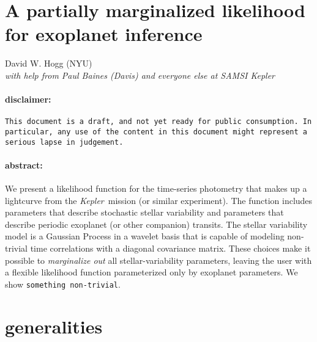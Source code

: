 \documentclass[12pt,letterpaper]{article}
\newcommand{\warning}[1]{\texttt{#1}}
\newcommand{\project}[1]{\textsl{#1}}
\newcommand{\Kepler}{\project{Kepler}}
\begin{document}
\sloppy\sloppypar

\section*{A partially marginalized likelihood for exoplanet inference}

\noindent
David W. Hogg (NYU) \\
\textit{with help from Paul Baines (Davis) and everyone else at SAMSI \Kepler}

\paragraph{disclaimer:}
\warning{This document is a draft, and not yet ready for public consumption.
In particular, any use of the content in this document might represent a serious lapse in judgement.}

\paragraph{abstract:}
We present a likelihood function for the time-series photometry
that makes up a lightcurve from the \Kepler\ mission (or similar experiment).
The function includes parameters that describe stochastic stellar variability
and parameters that describe periodic exoplanet (or other companion) transits.
The stellar variability model is a Gaussian Process in a wavelet basis
that is capable of modeling non-trivial time correlations with a diagonal covariance matrix.
These choices make it possible to \emph{marginalize out} all stellar-variability parameters,
leaving the user with a flexible likelihood function parameterized only by exoplanet parameters.
We show \warning{something non-trivial}.

\section{generalities}
\end{document}

